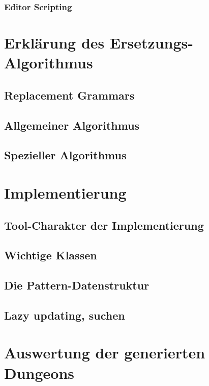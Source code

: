 \subsection{Editor Scripting}


\chapter{Erklärung des Ersetzungs-Algorithmus}

\section{Replacement Grammars}

\section{Allgemeiner Algorithmus}

\section{Spezieller Algorithmus}


\chapter{Implementierung}


\section{Tool-Charakter der Implementierung}

\section{Wichtige Klassen}


\section{Die Pattern-Datenstruktur}

\section{Lazy updating, suchen}


\chapter{Auswertung der generierten Dungeons}

